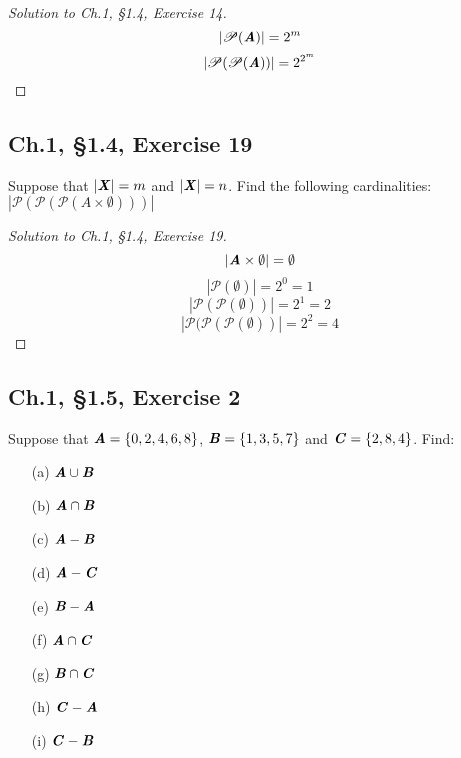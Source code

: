 \documentclass[12pt]{amsart}
\numberwithin{equation}{section}
\theoremstyle{definition}
\theoremstyle{remark}
\begin{document}
\begin{proof}[Solution to Ch.1, \S 1.4,  Exercise 14]

$$
| \mathscr{P}( \textbf{\textit{A}} ) | = 2^m
$$
$$
| \mathscr{P}( \mathscr{P} ( \textbf{\textit{A}} ) ) | = 2^{2^m}
$$

\end{proof}




\subsection*{Ch.1, \S 1.4,  Exercise 19} Suppose that $ | \textbf{\textit{X}} | = m $ and $ | \textbf{\textit{X}} | = n $. Find the following cardinalities: $ | \mathscr{P}( \mathscr{P} ( \mathscr{P}( A \times \emptyset ) ) ) | $ 


\begin{proof}[Solution to Ch.1, \S 1.4,  Exercise 19]

$$
| \textbf{\textit{A}} \times \emptyset | = \emptyset
$$
$$
| \mathscr{P}( \emptyset ) | = 2^0 = 1
$$
$$
| \mathscr{P}( \mathscr{P}( \emptyset ) ) | = 2^1 = 2
$$
$$
| \mathscr{P}( \mathscr{P} ( \mathscr{P} ( \emptyset ) ) | = 2^2 = 4
$$

\end{proof}




\subsection*{Ch.1, \S 1.5,  Exercise 2} Suppose that $ \textbf{\textit{A}} = \{0, 2, 4, 6, 8 \} $, $ \textbf{\textit{B}} = \{1, 3, 5, 7 \} $ and $ \textbf{\textit{C}} = \{2, 8, 4 \} $. Find:

\begin{enumerate}

\item[(a)]
$ \textbf{\textit{A}} \cup \textbf{\textit{B}} $
\item[(b)]
$ \textbf{\textit{A}} \cap \textbf{\textit{B}} $
\item[(c)]
$ \textbf{\textit{A}} - \textbf{\textit{B}} $
\item[(d)]
$ \textbf{\textit{A}} - \textbf{\textit{C}} $
\item[(e)]
$ \textbf{\textit{B}} - \textbf{\textit{A}} $
\item[(f)]
$ \textbf{\textit{A}} \cap \textbf{\textit{C}} $
\item[(g)]
$ \textbf{\textit{B}} \cap \textbf{\textit{C}} $
\item[(h)]
$ \textbf{\textit{C}} - \textbf{\textit{A}} $
\item[(i)]
$ \textbf{\textit{C}} - \textbf{\textit{B}} $

\end{enumerate} 
\end{document}
